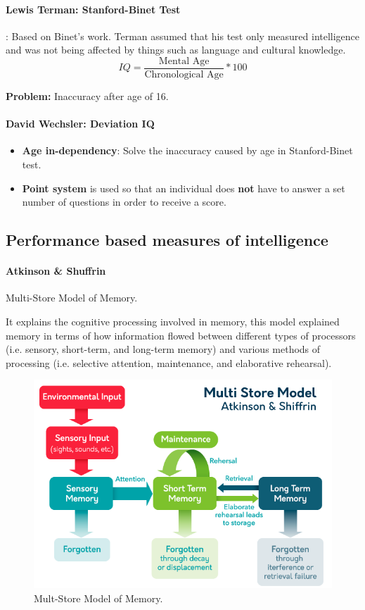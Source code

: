 \documentclass{article}
\begin{document}
	\paragraph{Lewis Terman: Stanford-Binet Test}: Based on Binet's work. Terman assumed that his test only measured intelligence and was not being affected by things such as language and cultural knowledge.
	\[
	IQ = \frac{\text{Mental Age}}{\text{Chronological Age}} * 100
	\]

	\textbf{Problem: } Inaccuracy after age of 16.

	\paragraph{David Wechsler: Deviation IQ}
	\begin{itemize}
		\item \textbf{Age in-dependency}: Solve the inaccuracy caused by age in Stanford-Binet test.
		\item \textbf{Point system} is used so that an individual does \textbf{not} have to answer a set number of questions in order to receive a score.
	\end{itemize}

	\subsection{Performance based measures of intelligence}
	\paragraph{Atkinson \& Shuffrin} Multi-Store Model of Memory.
	
	It explains the cognitive processing involved in memory, this model explained memory in terms of how information flowed between different types of processors (i.e. sensory, short-term, and long-term memory) and various methods of processing (i.e. selective attention, maintenance, and elaborative rehearsal).
	\begin{figure}
		\centering
		\includegraphics[width = \linewidth]{pic/Multi_store_model}
		\caption{Mult-Store Model of Memory.}
	\end{figure}
	
\end{document}
